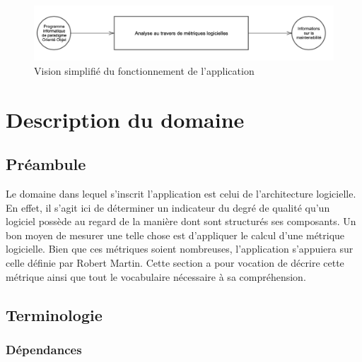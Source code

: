 \documentclass{scrartcl}
\begin{document}
\begin{figure}[ht]
    \centering
    \includegraphics[scale=0.65]{img/intro.png}
    \caption{Vision simplifié du fonctionnement de l'application} 
\end{figure}
    





\newpage
\section{Description du domaine}

\subsection{Préambule}

Le domaine dans lequel s'inscrit l'application est celui de l'architecture logicielle. En effet, il s'agit ici de déterminer un indicateur du degré de qualité qu'un logiciel possède au regard de la manière dont sont structurés ses composants. Un bon moyen de mesurer une telle chose est d'appliquer le calcul d'une métrique logicielle. Bien que ces métriques soient nombreuses, l'application s'appuiera sur celle définie par Robert Martin\cite{Martin:1994}. Cette section a pour vocation de décrire cette métrique ainsi que tout le vocabulaire nécessaire à sa compréhension.


    

\subsection{Terminologie}
\label{mm:terminologie}

\subsubsection{Dépendances}
\end{document}

